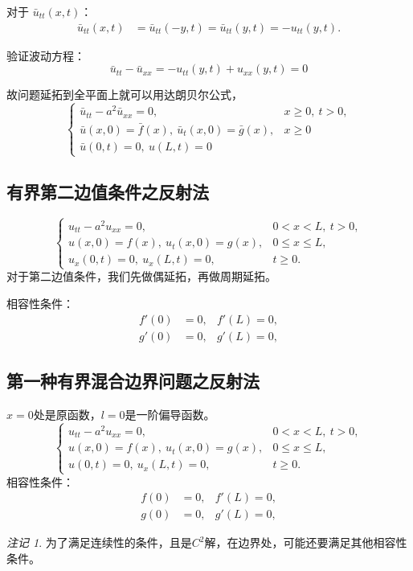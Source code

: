 \documentclass[12pt,a4paper]{article}
\numberwithin{subsection}{section}   %
\numberwithin{subsubsection}{subsection}
\theoremstyle{plain}
\theoremstyle{definition}
\theoremstyle{remark}
\newtheorem{remark}[theorem]{注记}
\theoremstyle{remark}
\begin{document}
对于 \(\bar{u}_{tt}(x, t)\)：
\[
\begin{aligned}
	\bar{u}_{tt}(x, t) &= \bar{u}_{tt}(-y, t) = \bar{u}_{tt}(y, t) = -u_{tt}(y, t).
\end{aligned}
\]

验证波动方程：
\[
\bar{u}_{tt} - \bar{u}_{xx} = -u_{tt}(y, t) + u_{xx}(y, t) = 0
\]

故问题延拓到全平面上就可以用达朗贝尔公式，
\begin{equation*}
	\begin{cases}
		\bar{u}_{tt} - a^2 \bar{u}_{xx} = 0, & x \geq  0 , \ t > 0, \\
		\bar{u}(x, 0) = \bar{f}(x), \ \bar{u}_t(x, 0) = \bar{g}(x), & x \geq  0 \\
		\bar{u}(0, t) = 0, \ u(L, t) = 0
	\end{cases}
\end{equation*}

\subsection{有界第二边值条件之反射法}
	\begin{equation}
		\begin{cases}
			u_{tt} - a^2 u_{xx} = 0, & 0 < x < L, \ t > 0, \\
			u(x, 0) = f(x), \ u_t(x, 0) = g(x), & 0 \leq x \leq L, \\
			u_x(0, t) = 0, \ u_x(L, t) = 0, & t \geq 0.
		\end{cases}
	\end{equation}
	对于第二边值条件，我们先做偶延拓，再做周期延拓。
	
相容性条件： 
	\begin{equation}
		\begin{aligned}
			f'(0) & = 0, & f'(L)  = 0, \\
			g'(0) & =0, & g'(L)  = 0,
		\end{aligned}
	\end{equation}
	
	
	\subsection{第一种有界混合边界问题之反射法}
$x=0$处是原函数，$ l=0$是一阶偏导函数。
	\begin{equation}
	\begin{cases}
		u_{tt} - a^2 u_{xx} = 0, & 0 < x < L, \ t > 0, \\
		u(x, 0) = f(x), \ u_t(x, 0) = g(x), & 0 \leq x \leq L, \\
		u(0, t) = 0, \ u_x(L, t) = 0, & t \geq 0.
	\end{cases}
\end{equation}
相容性条件：
\begin{equation}
\begin{aligned}
	f(0) & = 0, & f'(L)  = 0, \\
	g(0) & =0, & g'(L)  = 0,
\end{aligned}
\end{equation}
\begin{remark}
	为了满足连续性的条件，且是$C^2$解，在边界处，可能还要满足其他相容性条件。
\end{remark}
\end{document}
